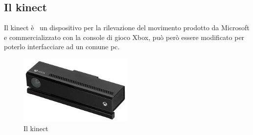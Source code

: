 \documentclass[10pt,a4paper]{article}
\begin{document}
\subsection{Il kinect}

Il kinect \`e \ un dispositivo per la rilevazione del movimento prodotto da Microsoft e commercializzato con la console di gioco Xbox, pu\`o per\`o essere modificato per poterlo interfacciare ad un comune pc.

\begin{figure}
  \begin{center}
    \includegraphics[width=0.5\textwidth]{kinect.jpg}
  \end{center}
  \caption{Il kinect}
\end{figure}
\end{document}
